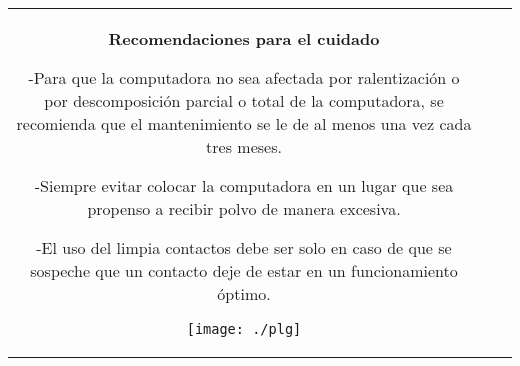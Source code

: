 \documentclass[landscape,12pt]{report}
\begin{document}
\begin{tabular}{c c c}
\begin{minipage}[t]{8.2cm}
					\vspace{0.7cm}
						\begin{center}
				\Large \bf
				Recomendaciones para el cuidado 
				\end{center}
					
					
					
					\medskip
					    -Para que la computadora no sea afectada por ralentizaci\'on o por descomposici\'on parcial o total de la computadora, se recomienda que el mantenimiento se le de al menos una vez cada tres meses.
					    
					    
					    
					    \medskip
					    -Siempre evitar colocar la computadora en un lugar que sea propenso a recibir polvo de manera excesiva.
					    
					    
					    
					    \medskip
					    -El uso del limpia contactos debe ser solo en caso de que se sospeche que un contacto deje de estar en un funcionamiento \'optimo.
		
		\begin{center}
				    	\texttt{[image: ./plg]}
			    	\end{center}					
				
				\end{minipage}

\end{tabular}
								
								
\newpage %
\end{document}
